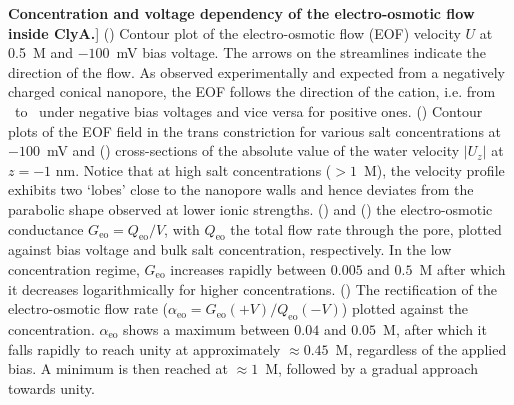 \begin{figure*}[htbp]
\caption
[\textbf{Concentration and voltage dependency of the electro-osmotic flow inside ClyA.}]
{
() Contour plot of the electro-osmotic flow (EOF) velocity $U$ at 0.5~M and 
$-100$~mV bias voltage. The arrows on the streamlines indicate the direction of the flow. As observed 
experimentally\cite{soskine2013} and expected from a negatively charged conical nanopore, the EOF follows the 
direction of the cation, i.e. from \cis\ to \trans\ under negative bias voltages and vice versa for positive 
ones.
()
Contour plots of the EOF field in the trans constriction for various salt concentrations at $-100$~mV and
()
cross-sections of the absolute value of the water velocity $\left|U_z\right|$ at $z=-1\text{~nm}$. Notice 
that at high salt concentrations ($>1$~M), the velocity profile exhibits two `lobes' close to the nanopore 
walls and hence deviates from the parabolic shape observed at lower ionic strengths.
() and () the 
electro-osmotic conductance $G_\text{eo} = Q_\text{eo}/V$, with $Q_\text{eo}$ the total flow rate through
the pore, plotted against bias voltage and bulk salt concentration, respectively. In the low concentration 
regime, $G_\text{eo}$ increases rapidly between $0.005$ and $0.5$~M after which it decreases logarithmically 
for higher concentrations.
()
The rectification of the electro-osmotic flow rate ($\alpha_\text{eo} = G_\text{eo}(+V)/Q_\text{eo}(-V)$) 
plotted against the concentration. $\alpha_\text{eo}$ shows a maximum between $0.04$ and $0.05$~M, after 
which it falls rapidly to reach unity at approximately $\approx0.45$~M, regardless of the applied bias. A 
minimum is then reached at $\approx1$~M, followed by a gradual approach towards unity.
}

\label{fig:electro-osmotic_flow}

\end{figure*}
